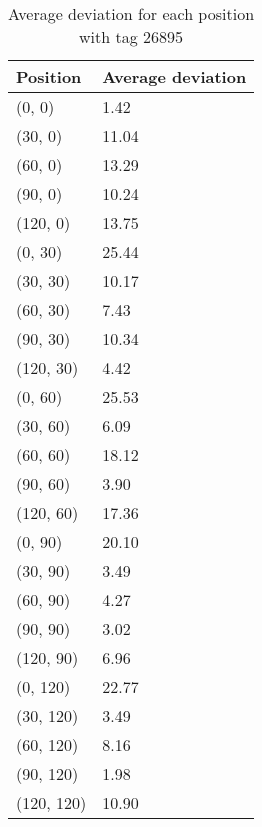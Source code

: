 \begin{table}[]
    \centering
    \begin{tabular}{|l|l|}
    \hline
    Position   & Average deviation \\ \hline
    (0, 0)     & 1.42              \\ \hline
    (30, 0)    & 11.04             \\ \hline
    (60, 0)    & 13.29             \\ \hline
    (90, 0)    & 10.24             \\ \hline
    (120, 0)   & 13.75             \\ \hline
    (0, 30)    & 25.44             \\ \hline
    (30, 30)   & 10.17             \\ \hline
    (60, 30)   & 7.43              \\ \hline
    (90, 30)   & 10.34             \\ \hline
    (120, 30)  & 4.42              \\ \hline
    (0, 60)    & 25.53             \\ \hline
    (30, 60)   & 6.09              \\ \hline
    (60, 60)   & 18.12             \\ \hline
    (90, 60)   & 3.90              \\ \hline
    (120, 60)  & 17.36             \\ \hline
    (0, 90)    & 20.10             \\ \hline
    (30, 90)   & 3.49              \\ \hline
    (60, 90)   & 4.27              \\ \hline
    (90, 90)   & 3.02              \\ \hline
    (120, 90)  & 6.96              \\ \hline
    (0, 120)   & 22.77             \\ \hline
    (30, 120)  & 3.49              \\ \hline
    (60, 120)  & 8.16              \\ \hline
    (90, 120)  & 1.98              \\ \hline
    (120, 120) & 10.90             \\ \hline
    \end{tabular}
    \label{Tab:average-deviation-1-tag}
    \caption{Average deviation for each position with tag 26895}
\end{table}

